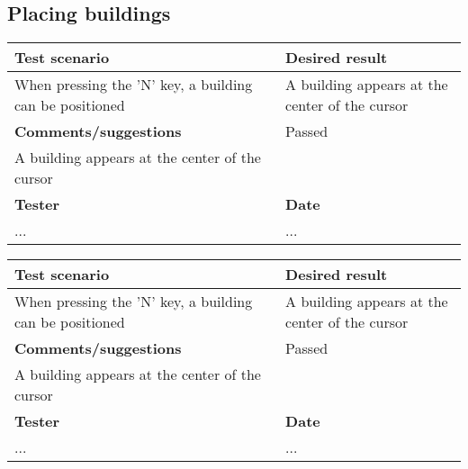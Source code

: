 \subsection{Placing buildings}

\begin{tabularx}{\textwidth}{|X|X|}
\hline
\textbf{Test scenario} & \textbf{Desired result}       
\\\hline
When pressing the 'N' key, a building can be positioned &
A building appears at the center of the cursor           
\\\hline
\textbf{Comments/suggestions} & Passed 
\\\hline
A building appears at the center of the cursor & \cellcolor{green}                         \\ \hline
\textbf{Tester} & \textbf{Date}               
\\\hline
... & ...                               		 
\\\hline
\end{tabularx}

\begin{tabularx}{\textwidth}{|X|X|}
\hline
\textbf{Test scenario} & \textbf{Desired result}       
\\\hline
When pressing the 'N' key, a building can be positioned &
A building appears at the center of the cursor           
\\\hline
\textbf{Comments/suggestions} & Passed 
\\\hline
A building appears at the center of the cursor & \cellcolor{red}                         \\ \hline
\textbf{Tester} & \textbf{Date}               
\\\hline
... & ...                               		 
\\\hline
\end{tabularx}
